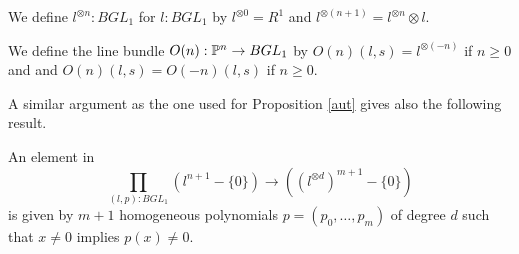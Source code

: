 We define $l^{\otimes n}:BGL_1$ for $l:BGL_1$ by $l^{\otimes 0} = R^1$ and $l^{\otimes (n+1)} = l^{\otimes n}\otimes l$.

We define the line bundle $O(n):\mathbb{P}^n\rightarrow BGL_1$ by $O(n)(l,s) = l^{\otimes (-n)}$ if $n\geq 0$ and 
and $O(n)(l,s) = O(-n)(l,s)$ if $n\geq 0$.

\medskip

 A similar argument as the one used for Proposition \ref{aut} gives also the following result.
 
 \begin{lemma}\label{hom}
   An element in
  $$\prod_{(l,p):BGL_1}(l^{n+1}-\{0\})\rightarrow ((l^{\otimes d})^{m+1}-\{0\})$$
  is given by $m+1$ homogeneous polynomials $p = (p_0,\dots,p_m)$ of degree $d$ such that
  $x\neq 0$ implies $p(x)\neq 0$.
\end{lemma}
